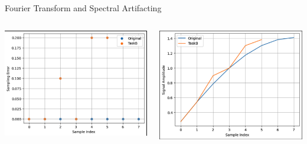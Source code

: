 \begin{frame}{Fourier Transform and Spectral Artifacting}
    \begin{columns}
        \begin{column}{0.5\textwidth}
            \includegraphics[height=1\textheight,width=1\textwidth,keepaspectratio]{images/Sampling_Error.png}
        \end{column}
        \begin{column}{0.5\textwidth}
            \includegraphics[height=1\textheight,width=1\textwidth,keepaspectratio]{images/Signal_Diff.png}
        \end{column}
    \end{columns}
\end{frame}

